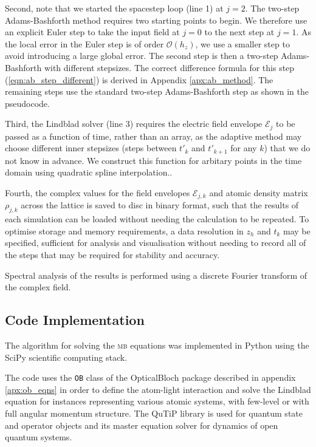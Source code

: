     Second, note that we started the spacestep loop (line 1) at $j\!=\!2$. The
    two-step Adams-Bashforth method requires two starting points to begin. We
    therefore use an explicit Euler step to take the input field at $j\!=\!0$ to
    the next step at $j\!=\!1$. As the local error in the Euler step is of order
    $\mathcal{O}(h_z)$, we use a smaller step to avoid introducing a large
    global error. The second step is then a two-step Adams-Bashforth with
    different stepsizes. The correct difference formula for this step
    (\ref{eqn:ab_step_different}) is derived in Appendix \ref{apx:ab_method}.
    The remaining steps use the standard two-step Adams-Bashforth step as shown
    in the pseudocode.

    Third, the Lindblad solver (line 3) requires the electric field envelope
    $\mathcal{E}_j$ to be passed as a function of time, rather than an array, as
    the adaptive method may choose different inner stepsizes (\ie steps between
    $t'_k$ and $t'_{k+1}$ for any $k$) that we do not know in advance. We
    construct this function for arbitary points in the time domain using
    quadratic spline interpolation.\cite{press2007numerical,DeBoor1972}.

    Fourth, the complex values for the field envelopes $\mathcal{E}_{j,k}$ and
    atomic density matrix $\rho_{j,k}$ across the lattice is saved to disc in
    binary format, such that the results of each simulation can be loaded
    without needing the calculation to be repeated. To optimise storage and
    memory requirements, a data resolution in $z_h$ and $t_k$ may be specified,
    sufficient for analysis and visualisation without needing to record all of
    the steps that may be required for stability and accuracy.

    Spectral analysis of the results is performed using a discrete Fourier
    transform of the complex field.\cite{press2007numerical}   

    \subsection{Code Implementation}

    The algorithm for solving the \textsc{mb} equations was implemented in
    Python using the SciPy scientific computing
    stack\cite{VanDerWalt2011,Jones}.

    The code uses the \texttt{OB} class of the OpticalBloch package described
    in appendix \ref{apx:ob_eqns} in order to define the atom-light
    interaction and solve the Lindblad equation for instances representing
    various atomic systems, with few-level or with full angular momentum
    structure. The QuTiP library\cite{Nation2013} is used for quantum state
    and operator objects and its master equation solver for dynamics of open
    quantum systems.

